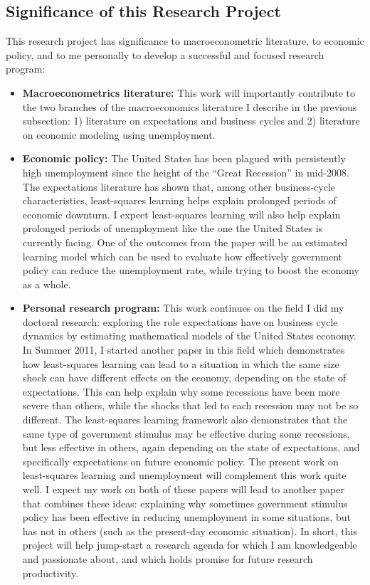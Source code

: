 \documentclass[11pt]{article}
\newcommand{\bi}{
  \begin{itemize}
  \setlength{\itemsep}{0pt}
  \setlength{\parskip}{0pt}
}
\newcommand{\ei}{\end{itemize}}
\begin{document}
\subsection{Significance of this Research Project}
This research project has significance to macroeconometric literature, to economic policy, and to me personally to develop a successful and focused research program:

\bi
\item \textbf{Macroeconometrics literature:}  This work will importantly contribute to the two branches of the macroeconomics literature I describe in the previous subsection: 1) literature on expectations and business cycles and 2) literature on economic modeling using unemployment. 
\item \textbf{Economic policy:}  The United States has been plagued with persistently high unemployment since the height of the ``Great Recession'' in mid-2008.   The expectations literature has shown that, among other business-cycle characteristics, least-squares learning helps explain prolonged periods of economic downturn.  I expect least-squares learning will also help explain prolonged periods of unemployment like the one the United States is currently facing.  One of the outcomes from the paper will be an estimated learning model which can be used to evaluate how effectively government policy can reduce the unemployment rate, while trying to boost the economy as a whole.
\item \textbf{Personal research program:}  This work continues on the field I did my doctoral research: exploring the role expectations have on business cycle dynamics by estimating mathematical models of the United States economy.  In Summer 2011, I started another paper in this field which demonstrates how least-squares learning can lead to a situation in which the same size shock can have different effects on the economy, depending on the state of expectations.  This can help explain why some recessions have been more severe than others, while the shocks that led to each recession may not be so different.  The least-squares learning framework also demonstrates that the same type of government stimulus may be effective during some recessions, but less effective in others, again depending on the state of expectations, and specifically expectations on future economic policy.  The present work on least-squares learning and unemployment will complement this work quite well.  I expect my work on both of these papers will lead to another paper that combines these ideas: explaining why sometimes government stimulus policy has been effective in reducing unemployment in some situations, but has not in others (such as the present-day economic situation).  In short, this project will help jump-start a research agenda for which I am knowledgeable and passionate about, and which holds promise for future research productivity.
\ei
\end{document}
